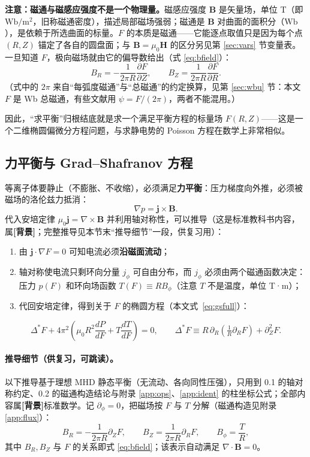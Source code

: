 \documentclass[12pt,fontset=none]{ctexart}
\numberwithin{equation}{section}
\numberwithin{table}{section}
\numberwithin{figure}{section}
\newcommand{\evbg}{\textbf{[背景]}}
\begin{document}
\textbf{注意：磁通与磁感应强度不是一个物理量。}磁感应强度 $\bm{B}$ 是矢量场，单位 T（即 $\mathrm{Wb}/\mathrm{m}^2$，旧称磁通密度），描述局部磁场强弱；磁通是 $\bm{B}$ 对曲面的面积分（$\mathrm{Wb}$），是依赖于所选曲面的标量。$F$ 的本质是磁通——它能逐点取值只是因为每个点 $(R,Z)$ 锚定了各自的圆盘面；与 $\bm{B}=\mu_0\bm{H}$ 的区分另见第 \ref{sec:vars} 节变量表。一旦知道 $F$，极向磁场就由它的偏导数给出（式 \eqref{eq:bfield}）：
\[
  B_R=-\frac{1}{2\pi R}\frac{\partial F}{\partial Z},\qquad
  B_Z=\frac{1}{2\pi R}\frac{\partial F}{\partial R}.
\]
（式中的 $2\pi$ 来自``每弧度磁通''与``总磁通''的约定换算，见第 \ref{sec:wbu} 节：本文 $F$ 是 Wb 总磁通，有些文献用 $\psi=F/(2\pi)$，两者不能混用。）

因此，``求平衡''归根结底就是求一个满足平衡方程的标量场 $F(R,Z)$——这是一个二维椭圆偏微分方程问题，与求静电势的 Poisson 方程在数学上非常相似。

\subsection{力平衡与 Grad--Shafranov 方程}\label{sec:primer-gs}

等离子体要静止（不膨胀、不收缩），必须满足\textbf{力平衡}：压力梯度向外推，必须被磁场的洛伦兹力抵消：
\[
  \nabla p=\bm{j}\times\bm{B}.
\]
代入安培定律 $\mu_0\bm{j}=\nabla\times\bm{B}$ 并利用轴对称性，可以推导（这是标准教科书内容，属\evbg{}；完整推导见本节末``推导细节''一段，供复习用）：

\begin{enumerate}[nosep]
  \item 由 $\bm{j}\cdot\nabla F=0$ 可知电流必须\textbf{沿磁面流动}；
  \item 轴对称使电流只剩环向分量 $j_\phi$ 可自由分布，而 $j_\phi$ 必须由两个磁通函数决定：压力 $p(F)$ 和环向场函数 $T(F)\equiv RB_\phi$（注意 $T$ 不是温度，单位 T·m）；
  \item 代回安培定律，得到关于 $F$ 的椭圆方程（本文式~\eqref{eq:gsfull}）：
\end{enumerate}
\[
  \Delta^*F+4\pi^2\left(\mu_0R^2\frac{dP}{dF}+T\frac{dT}{dF}\right)=0,
  \qquad \Delta^*F\equiv R\,\partial_R\!\left(\tfrac1R\partial_RF\right)+\partial_Z^2F .
\]

\paragraph{推导细节（供复习，可跳读）。}以下推导基于理想 MHD 静态平衡（无流动、各向同性压强），只用到 0.1 的轴对称约定、0.2 的磁通构造结论与附录 \ref{app:ops}、\ref{app:ident} 的柱坐标公式；全部内容属\evbg{}标准数学。记 $\partial_\phi=0$，把磁场按 $F$ 与 $T$ 分解（磁通构造见附录 \ref{app:flux}）：
\[
B_R=-\frac{1}{2\pi R}\partial_ZF,\qquad B_Z=\frac{1}{2\pi R}\partial_RF,\qquad B_\phi=\frac{T}{R},
\]
其中 $B_R,B_Z$ 与 $F$ 的关系即式 \eqref{eq:bfield}；该表示自动满足 $\nabla\cdot\bm{B}=0$。
\end{document}

